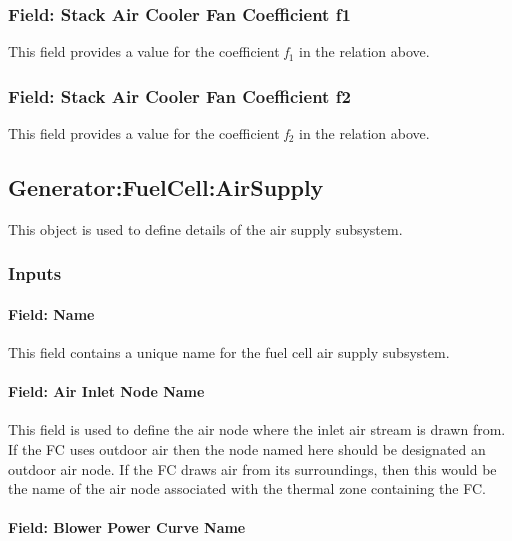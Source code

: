 \subsubsection{Field: Stack Air Cooler Fan Coefficient f1}\label{field-stack-air-cooler-fan-coefficient-f1}

This field provides a value for the coefficient \emph{f\(_{1}\)} in the relation above.

\subsubsection{Field: Stack Air Cooler Fan Coefficient f2}\label{field-stack-air-cooler-fan-coefficient-f2}

This field provides a value for the coefficient \emph{f\(_{2}\)} in the relation above.

\subsection{Generator:FuelCell:AirSupply}\label{generatorfuelcellairsupply}

This object is used to define details of the air supply subsystem.

\subsubsection{Inputs}\label{inputs-14-003}

\paragraph{Field: Name}\label{field-name-16-001}

This field contains a unique name for the fuel cell air supply subsystem.

\paragraph{Field: Air Inlet Node Name}\label{field-air-inlet-node-name-1-000}

This field is used to define the air node where the inlet air stream is drawn from. If the FC uses outdoor air then the node named here should be designated an outdoor air node. If the FC draws air from its surroundings, then this would be the name of the air node associated with the thermal zone containing the FC.

\paragraph{Field: Blower Power Curve Name}\label{field-blower-power-curve-name}

